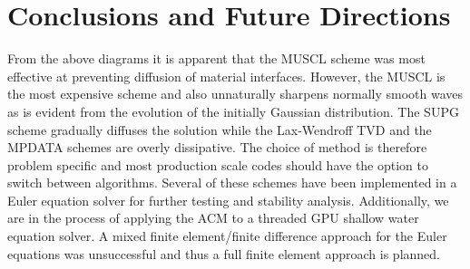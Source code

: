 \section{Conclusions and Future Directions}
\label{conclusions}

From the above diagrams it is apparent that the MUSCL scheme was most effective at preventing diffusion of material interfaces. However, the MUSCL is the most expensive scheme and also unnaturally sharpens normally smooth waves as is evident from the evolution of the initially Gaussian distribution. The SUPG scheme gradually diffuses the solution while the Lax-Wendroff TVD and the MPDATA schemes are overly dissipative. The choice of method is therefore problem specific and most production scale codes should have the option to switch between algorithms. Several of these schemes have been implemented in a Euler equation solver for further testing and stability analysis. Additionally, we are in the process of applying the ACM to a threaded GPU shallow water equation solver. A mixed finite element/finite difference approach for the Euler equations was unsuccessful and thus a full finite element approach is planned.